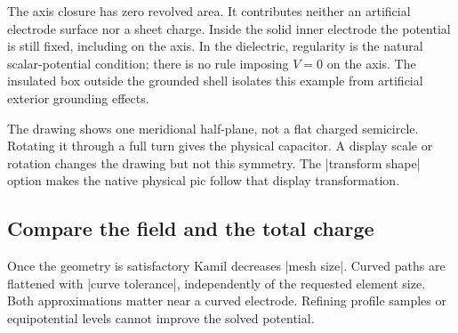 The axis closure has zero revolved area. It contributes neither an artificial
electrode surface nor a sheet charge. Inside the solid inner electrode the
potential is still fixed, including on the axis. In the dielectric, regularity
is the natural scalar-potential condition; there is no rule imposing $V=0$
on the axis. The insulated box outside the grounded shell isolates this
example from artificial exterior grounding effects.

\begin{codeexample}[width=0pt]
\end{codeexample}

The drawing shows one meridional half-plane, not a flat charged semicircle.
Rotating it through a full turn gives the physical capacitor. A display scale
or rotation changes the drawing but not this symmetry. The |transform shape|
option makes the native physical pic follow that display transformation.

\subsection{Compare the field and the total charge}
Once the geometry is satisfactory Kamil decreases |mesh size|. Curved paths
are flattened with |curve tolerance|, independently of the requested element
size. Both approximations matter near a curved electrode. Refining profile
samples or equipotential levels cannot improve the solved potential.

\begin{codeexample}[width=0pt]
\end{codeexample}

